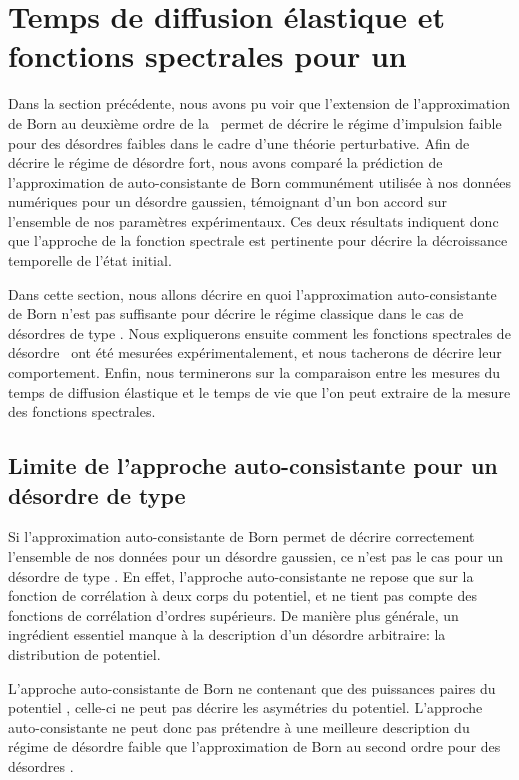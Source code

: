 \section{Temps de diffusion élastique et fonctions spectrales pour un \speckle}

Dans la section précédente, nous avons pu voir que l'extension de l'approximation de Born au deuxième ordre de la \selfenergy\ permet de décrire le régime d'impulsion faible pour des désordres faibles dans le cadre d'une théorie perturbative. Afin de décrire le régime de désordre fort, nous avons comparé la prédiction de l'approximation de auto-consistante de Born communément utilisée à nos données numériques pour un désordre gaussien, témoignant d'un bon accord sur l'ensemble de nos paramètres expérimentaux. Ces deux résultats indiquent donc que l'approche de la fonction spectrale est pertinente pour décrire la décroissance temporelle de l'état initial.

Dans cette section, nous allons décrire en quoi l'approximation auto-consistante de Born n'est pas suffisante pour décrire le régime classique dans le cas de désordres de type \speckle . Nous expliquerons ensuite comment les fonctions spectrales de désordre \speckle\ ont été mesurées expérimentalement, et nous tacherons de décrire leur comportement. Enfin, nous terminerons sur la comparaison entre les mesures du temps de diffusion élastique et le temps de vie que l'on peut extraire de la mesure des fonctions spectrales.


\subsection{Limite de l'approche auto-consistante pour un désordre de type \speckle}
Si l'approximation auto-consistante de Born permet de décrire correctement l'ensemble de nos données pour un désordre gaussien, ce n'est pas le cas pour un désordre de type \speckle . En effet, l'approche auto-consistante ne repose que sur la fonction de corrélation à deux corps du potentiel, et ne tient pas compte des fonctions de corrélation d'ordres supérieurs. De manière plus générale, un ingrédient essentiel manque à la description d'un désordre arbitraire: la distribution de potentiel. 

L'approche auto-consistante de Born ne contenant que des puissances paires du potentiel \citep{trappe2015semiclassical}, celle-ci ne peut pas décrire les asymétries du potentiel. L'approche auto-consistante ne peut donc pas prétendre à une meilleure description du régime de désordre faible que l'approximation de Born au second ordre pour des désordres \speckle . 

